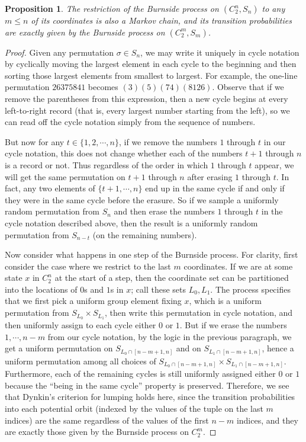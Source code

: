 \documentclass[11pt]{article}
\newcounter{r}
\newcounter{s}
\numberwithin{equation}{section}
\newtheorem{proposition}[theorem]{Proposition}
\begin{document}
\begin{proposition}\label{restricttocoordinates}
The restriction of the Burnside process on $(C_2^n, S_n)$ to any $m \le n$ of its coordinates is also a Markov chain, and its transition probabilities are exactly given by the Burnside process on $(C_2^m, S_m)$.
\end{proposition}

\begin{proof}
Given any permutation $\sigma \in S_n$, we may write it uniquely in cycle notation by cyclically moving the largest element in each cycle to the beginning and then sorting those largest elements from smallest to largest. For example, the one-line permutation $26375841$ becomes $(3)(5)(74)(8126)$. Observe that if we remove the parentheses from this expression, then a new cycle begins at every left-to-right record (that is, every largest number starting from the left), so we can read off the cycle notation simply from the sequence of numbers.

But now for any $t \in \{1, 2, \cdots, n\}$, if we remove the numbers $1$ through $t$ in our cycle notation, this does not change whether each of the numbers $t+1$ through $n$ is a record or not. Thus regardless of the order in which $1$ through $t$ appear, we will get the same permutation on $t+1$ through $n$ after erasing $1$ through $t$. In fact, any two elements of $\{t+1, \cdots, n\}$ end up in the same cycle if and only if they were in the same cycle before the erasure. So if we sample a uniformly random permutation from $S_n$ and then erase the numbers $1$ through $t$ in the cycle notation described above, then the result is a uniformly random permutation from $S_{n-t}$ (on the remaining numbers).

Now consider what happens in one step of the Burnside process. For clarity, first consider the case where we restrict to the last $m$ coordinates. If we are at some state $x$ in $C_2^n$ at the start of a step, then the coordinate set can be partitioned into the locations of $0$s and $1$s in $x$; call these sets $L_0, L_1$. The process specifies that we first pick a uniform group element fixing $x$, which is a uniform permutation from $S_{L_0} \times S_{L_1}$, then write this permutation in cycle notation, and then uniformly assign to each cycle either $0$ or $1$. But if we erase the numbers $1, \cdots, n-m$ from our cycle notation, by the logic in the previous paragraph, we get a uniform permutation on $S_{L_0 \cap [n-m+1, n]}$ and on $S_{L_1 \cap [n-m+1, n]}$, hence a uniform permutation among all choices of $S_{L_0 \cap [n-m+1, n]} \times S_{L_1 \cap [n-m+1, n]}$. Furthermore, each of the remaining cycles is still uniformly assigned either $0$ or $1$ because the ``being in the same cycle'' property is preserved. Therefore, we see that Dynkin's criterion for lumping holds here, since the transition probabilities into each potential orbit (indexed by the values of the tuple on the last $m$ indices) are the same regardless of the values of the first $n-m$ indices, and they are exactly those given by the Burnside process on $C_2^m$.


\end{proof}
\end{document}

